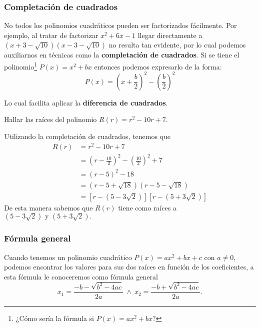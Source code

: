 \subsubsection{Completación de cuadrados}

No todos los polinomios cuadráticos pueden ser factorizados fácilmente.
Por ejemplo, al tratar de factorizar $x^2 + 6x - 1$ llegar directamente a $(x + 3 - \sqrt {10})(x-3-\sqrt {10})$ no resulta tan evidente, por lo cual podemos auxiliarnos en técnicas como la \textbf{completación de cuadrados}.
Si se tiene el polinomio\footnote{¿Cómo sería la fórmula si $P(x) = ax^2 + bx$?} $P(x) = x^2 + bx$ entonces podemos expresarlo de la forma:
\[
    P(x) = \left( x + \frac{b}{2} \right)^2 - \left( \frac{b}{2} \right)^2
\]

Lo cual facilita aplicar la \textbf{diferencia de cuadrados}.

\begin{section-example.tcb}
    Hallar las raíces del polinomio $R(r) = r^2 - 10r + 7.$
\end{section-example.tcb}
\begin{solution}
{
    Utilizando la completación de cuadrados, tenemos que
    \begin{align*}
        R(r) &= r^2 - 10r + 7\\
        &= \left( r - \frac{10}{2} \right)^2 - \left( \frac{10}{2} \right)^2 + 7\\
        &= \left( r - 5 \right)^2 - 18\\
        &= \left( r - 5 + \sqrt {18} \right)\left( r - 5 - \sqrt {18} \right)\\
        &= \left[ r - \left( 5 - 3\sqrt {2} \right)\right]\left[ r - \left( 5 + 3\sqrt {2} \right)\right]
    \end{align*}
    De esta manera sabemos que $R(r)$ tiene como raíces a $\left( 5 - 3\sqrt {2} \right) \mbox{ y } \left( 5 + 3\sqrt {2} \right).$
}
\end{solution}


\subsubsection{Fórmula general}

Cuando tenemos un polinomio cuadrático $P(x) = ax^2 + bx + c$ con $a \neq 0$, podemos encontrar los valores para sus dos raíces en función de los coeficientes, a esta fórmula le conoceremos como fórmula general
\[
    x_1 = \frac{-b - \sqrt {b^2 - 4ac}}{2a}\ \land \ x_2 = \frac{-b + \sqrt {b^2 - 4ac}}{2a}.
\]

